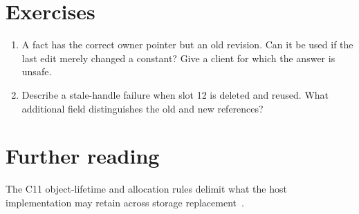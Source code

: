 \section{Exercises}
\label{sec:pebble-five-exercises}
\begin{enumerate}
\item \label{ex:pebble-revision} A fact has the correct owner pointer but an old revision. Can it be used if the last edit merely changed a constant? Give a client for which the answer is unsafe.
\item \label{ex:pebble-generation} Describe a stale-handle failure when slot 12 is deleted and reused. What additional field distinguishes the old and new references?
\end{enumerate}

\section{Further reading}
\label{sec:pebble-five-reading}
The C11 object-lifetime and allocation rules delimit what the host implementation may retain across storage replacement~\cite[Sections~6.2.4 and~7.22.3]{wg14-2011-c11}.
